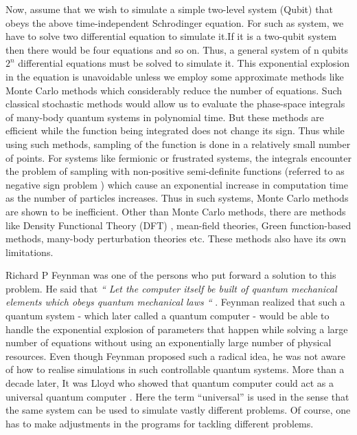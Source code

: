 \documentclass[12pt,a4paper]{report}
\begin{document}
Now, assume that we wish to simulate a simple two-level system (Qubit) that obeys the above time-independent Schrodinger equation. For such as system, we have to solve two differential equation to simulate it.If it is a two-qubit system then there would be four equations and so on. Thus, a general system of n qubits $2^{n}$ differential equations must be solved to simulate it. This exponential explosion in the equation is unavoidable unless we employ some approximate methods like Monte Carlo methods\cite{monte} which considerably reduce the number of equations. Such classical stochastic methods would allow us to evaluate the phase-space integrals of many-body quantum systems in polynomial time. But these methods are efficient while the function being integrated does not change its sign. Thus while using such methods, sampling of the function is done in a relatively small number of points. For systems like fermionic or frustrated systems, the integrals encounter the problem of sampling with non-positive semi-definite functions (referred to as negative sign problem\cite{troyer} \cite{georgescu} ) which cause an exponential increase in computation time as the number of particles increases. Thus in such systems, Monte Carlo methods are shown to be inefficient. Other than Monte Carlo methods, there are methods like Density Functional Theory (DFT) \cite{dft}, mean-field theories, Green function-based methods, many-body perturbation theories \cite{mbpt} etc. These methods also have its own limitations.

Richard P Feynman was one of the persons who put forward a solution to this problem. He said that \emph{“ Let the computer itself be built of quantum mechanical elements which obeys quantum mechanical laws “} \cite{feynman82}. Feynman realized that such a quantum system - which later called a quantum computer - would be able to handle the exponential explosion of parameters that happen while solving a large number of equations without using an exponentially large number of physical resources. Even though Feynman proposed such a radical idea, he was not aware of how to realise simulations in such controllable quantum systems. More than a decade later, It was Lloyd who showed that quantum computer could act as a universal quantum computer \cite{lloyd}. Here the term “universal” is used in the sense that the same system can be used to simulate vastly different problems. Of course, one has to make adjustments in the programs for tackling different problems. 
\end{document}
